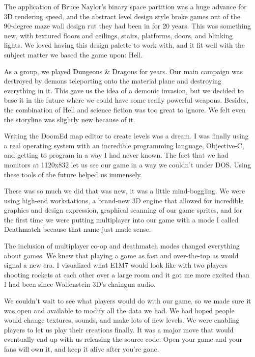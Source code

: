 \par
The application of Bruce Naylor's binary space partition was a huge advance for 3D rendering speed, and the abstract level design style broke games out of the 90-degree maze wall design rut they had been in for 20 years. This was something new, with textured floors and ceilings, stairs, platforms, doors, and blinking lights. We loved having this design palette to work with, and it fit well with the subject matter we based the game upon: Hell.\\
\par
As a group, we played Dungeons \& Dragons for years. Our main campaign was destroyed by demons teleporting onto the material plane and destroying everything in it. This gave us the idea of a demonic invasion, but we decided to base it in the future where we could have some really powerful weapons. Besides, the combination of Hell and science fiction was too great to ignore. We felt even the storyline was slightly new because of it.\\
\par
Writing the DoomEd map editor to create levels was a dream. I was finally using a real operating system with an incredible programming language, Objective-C, and getting to program in a way I had never known. The fact that we had monitors at 1120x832 let us see our game in a way we couldn't under DOS. Using these tools of the future helped us immensely.\\
\par
There was so much we did that was new, it was a little mind-boggling. We were using high-end workstations, a brand-new 3D engine that allowed for incredible graphics and design expression, graphical scanning of our game sprites, and for the first time we were putting multiplayer into our game with a mode I called Deathmatch because that name just made sense.\\
\par
The inclusion of multiplayer co-op and deathmatch modes changed everything about games. We knew that playing a game as fast and over-the-top as \doom{} would signal a new era. I visualized what E1M7 would look like with two players shooting rockets at each other over a large room and it got me more excited than I had been since Wolfenstein 3D's chaingun audio.\\
\par
We couldn't wait to see what players would do with our game, so we made sure it was open and available to modify all the data we had. We had hoped people would change textures, sounds, and make lots of new levels. We were enabling players to let us play their creations finally. It was a major move that would eventually end up with us releasing the source code. Open your game and your fans will own it, and keep it alive after you're gone.\\
